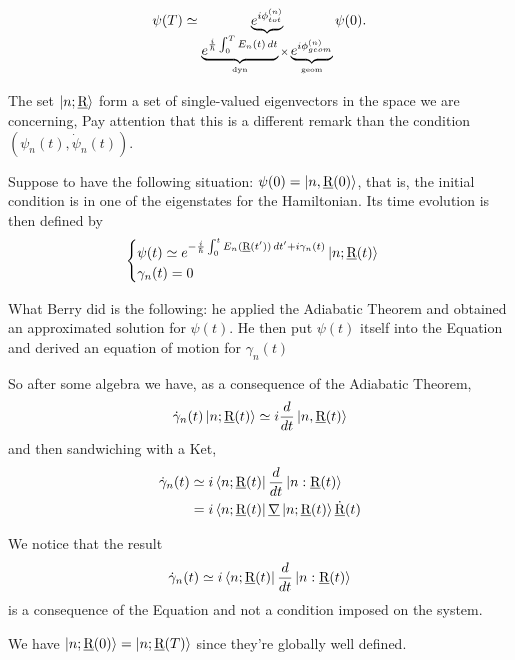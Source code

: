 \begin{equation}
\psi(T)\simeq \underbrace{e^{i\phi_{tot}^{(n)}}}_{\underbrace{e^{\frac{i}{\hbar}\int_{0}^{T}E_n(t)\mathop{}\!d t}}_{\text{dyn}}\times\underbrace{e^{i\phi_{geom}^{(n)}}}_{\text{geom}}}\psi(0).
\end{equation}

\begin{rem}
	The set $ \Ket{n;\underline{\textrm{R}}} $ form a set of single-valued eigenvectors in the space we are concerning, Pay attention that this is a different remark than the condition $ \left(\psi_n(t),\dot{\psi}_n(t) \right) $.
\end{rem}

Suppose to have the following situation: $ \psi(0)=\Ket{n,\underline{\textrm{R}}(0)} $, that is, the initial condition is in one of the eigenstates for the Hamiltonian. Its time evolution is then defined by
\begin{equation}
\begin{cases}
\psi(t)\simeq e^{-\frac{i}{\hbar}\int_{0}^{t}E_n(\underline{\textrm{R}}(t'))\mathop{}\!d t'+i\gamma_n(t)}\Ket{n;\underline{\textrm{R}}(t)}\\
\gamma_n(t)=0
\end{cases}
\end{equation}

\begin{rem}
	What Berry did is the following: he applied the Adiabatic Theorem and obtained an approximated solution for $ \psi(t) $. He then put $ \psi(t) $ itself into the \Sch Equation and derived an equation of motion for $ \gamma_n(t) $
\end{rem}

So after some algebra we have, as a consequence of the Adiabatic Theorem,
\begin{equation}
\dot{\gamma}_n(t)\Ket{n;\underline{\textrm{R}}(t)}\simeq i\frac{d}{dt} \Ket{n,\underline{\textrm{R}}(t)}
\end{equation}
and then sandwiching with a Ket,
\begin{align}
	\dot{\gamma}_n(t)&\simeq i\Bra{n;\underline{\textrm{R}}(t)}\frac{d}{dt}\Ket{n:\underline{\textrm{R}}(t)}\\
	&=i\Bra{n;\underline{\textrm{R}}(t)}\underline{\nabla}\Ket{n;\underline{\textrm{R}}(t)}\dot{\underline{\textrm{R}}}(t)
\end{align}

\begin{rem}
	We notice that the result \begin{equation}
	\dot{\gamma}_n(t)\simeq i\Bra{n;\underline{\textrm{R}}(t)}\frac{d}{dt}\Ket{n:\underline{\textrm{R}}(t)}
	\end{equation}
	is a consequence of the \Sch Equation and not a condition imposed on the system.
\end{rem}
\begin{rem}
	We have $ \Ket{n;\underline{\textrm{R}}(0)}=\Ket{n;\underline{\textrm{R}}(T)} $ since they're globally well defined.
\end{rem}

